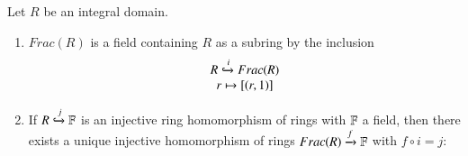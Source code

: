 \documentclass[12pt, a4paper, oneside, openright, titlepage]{book}
\begin{document}
\begin{namthm}
    Let $R$ be an integral domain.
    \begin{enumerate}
        \item $Frac(R)$ is a field containing $R$ as a subring by the inclusion \begin{equation}
            \begin{array}{c} R\xhookrightarrow{i} Frac(R) \\ r\mapsto [(r,1)] \end{array}
        \end{equation}
        \item If $R \xhookrightarrow{j} \mathbb F$ is an injective ring homomorphism of rings with $\mathbb F$ a field, then there exists a unique injective homomorphism of rings $Frac(R) \xrightarrow{f}\mathbb F$ with $f \circ i = j$:
        \begin{center}
        \end{center}
    \end{enumerate}
\end{namthm}
\end{document}
